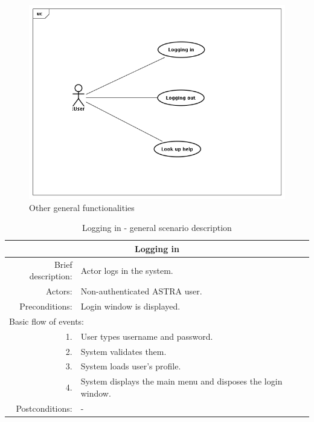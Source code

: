 \begin{figure}[h!]
 \begin{center}
 \includegraphics[scale=0.5]{diagrams/UseCasesOthers.png}
 \end{center}
 \caption{\label{img:uc-others}Other general functionalities}
\end{figure}

\begin{table}[h!]
	\small
    \begin{center}
		\begin{tabular}{||r|l||}
		\hline \hline
		\multicolumn{2}{||c||}{\bfseries{Logging in}} \\
		\hline
		\hline 
		Brief description: & Actor logs in the system.\\
		\hline
		Actors: & Non-authenticated ASTRA user. \\
		\hline
		Preconditions: &  Login window is displayed. \\
		\hline \hline
		\multicolumn{2}{||l||}{Basic flow of events:} \\
		\hline \hline
			1. & User types username and password. \\
			2. & System validates them. \\
			3. & System loads user's profile. \\ 
			4. & System displays the main menu and disposes the login window. \\
			\hline \hline Postconditions: &  - \\
		\hline \hline
		\end{tabular}
		\caption{\label{table:login}Logging in - general scenario  description}
	\end{center}
\end{table}

